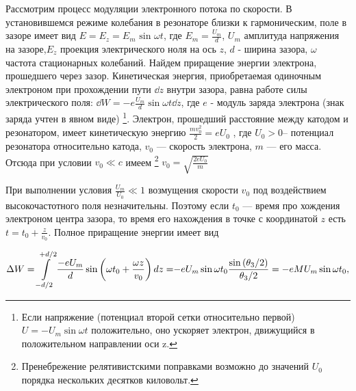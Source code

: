 Рассмотрим процесс модуляции электронного потока по скорости. В установившемся режиме колебания в резонаторе близки к гармоническим, поле в зазоре имеет вид 
$E = E _ { z } = E _ { m } \text { sin } \omega t$, 
где $E _ { m } = \frac { U _ { m } } { d }$, $U _ { m }$ амплитуда напряжения на зазоре,$E _ { z }$ проекция электрического ноля на ось $z$,
$d$ - ширина зазора, $\omega$ частота стационарных колебаний. Найдем приращение энергии электрона, прошедшего через зазор. Кинетическая энергия,
приобретаемая одиночным электроном при прохождении пути $\dd z$ внутри за­зора, равна работе силы электрического поля: 
$\dd W = - e \frac { U _ { m } } { d } \sin \omega t \dd z$, 
где $e$ - модуль заряда электрона (знак заряда учтен в явном виде)
\footnote{Если напряжение (потенциал второй сетки относительно первой) $U = -U_m \sin \omega t$ положительно, оно ускоряет электрон, движущийся в положительном направлении оси z.}. 
Электрон, прошедший расстояние между катодом и резонатором, имеет кинетическую энергию 
$\frac { m v _ { 0 } ^ { 2 } } { 2 } = e U _ { 0 }$ , где $U_0 > 0$-- потенциал резонатора относительно ка­тода, $v_0$ — скорость электрона, $m$ — его масса. Отсюда при условии $v _ { 0 } \ll c$ имеем
\footnote{Пренебрежение релятивистскими поправками возможно до значений $U_0$ порядка нескольких
десятков киловольт.} 
$v _ { 0 } = \sqrt { \frac { 2 e U _ { 0 } } { m } }$

При выполнении условия 
$\frac { U _ { m } } { U _ { 0 } } \ll 1$ возмущения скорости $v_0$ под воздействием высокочастотного поля незначительны. Поэтому если $t_0$ — время про­
хождения электроном центра зазора, то время его нахождения в точке с координатой $z$ есть $t = t _ { 0 } + \frac { z } { v _ { 0 } }$. Полное приращение энергии имеет вид

\begin{equation}
	 { \Delta W = \int\limits _ { - d / 2 }^{{ + d / 2 }} \frac { - e U _ { m } } { d } \sin \left( \omega t _ { 0 } + \frac { \omega z } { v _ { 0 } } \right) d z = } \\ 
	 { - e U _ { m } \sin \omega t _ { 0 } \frac { \sin \left( \theta _ { 3 } / 2 \right) } { \theta_ { 3 } / 2 } = - e M U _ { m } \sin \omega t _ { 0 }, } 
	\label{eq:1}
\end{equation}

